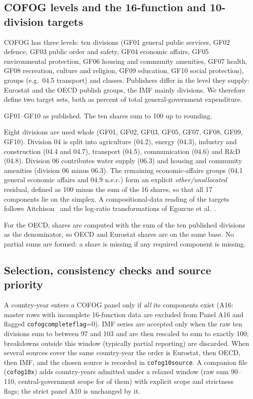 \documentclass[11pt,a4paper]{article}
\DeclareRobustCommand*{\_}{\textunderscore\hskip0pt\relax}
\begin{document}
\subsection{COFOG levels and the 16-function and 10-division targets}
COFOG has three levels: ten divisions (GF01 general public services, GF02 defence, GF03 public order and safety, GF04 economic affairs, GF05 environmental protection, GF06 housing and community amenities, GF07 health, GF08 recreation, culture and religion, GF09 education, GF10 social protection), groups (e.g.\ 04.5 transport) and classes. Publishers differ in the level they supply: Eurostat and the OECD publish groups, the IMF mainly divisions. We therefore define two target sets, both as percent of total general-government expenditure.
\begin{description}[leftmargin=1.2em,itemsep=2pt,parsep=0pt]
\item[A10 (ten divisions).] GF01--GF10 as published. The ten shares sum to 100 up to rounding.
\item[A16 (sixteen functions plus residual).] Eight divisions are used whole (GF01, GF02, GF03, GF05, GF07, GF08, GF09, GF10). Division 04 is split into agriculture (04.2), energy (04.3), industry and construction (04.4 and 04.7), transport (04.5), communication (04.6) and R\&D (04.8). Division 06 contributes water supply (06.3) and housing and community amenities (division 06 minus 06.3). The remaining economic-affairs groups (04.1 general economic affairs and 04.9 n.e.c.) form an explicit \emph{other/unallocated} residual, defined as 100 minus the sum of the 16 shares, so that all 17 components lie on the simplex. A compositional-data reading of the targets follows Aitchison~\cite{aitchison1986} and the log-ratio transformations of Egozcue et al.~\cite{egozcue2003}.
\end{description}
For the OECD, shares are computed with the sum of the ten published divisions as the denominator, so OECD and Eurostat shares are on the same base. No partial sums are formed: a share is missing if any required component is missing.

\subsection{Selection, consistency checks and source priority}
A country-year enters a COFOG panel only if \emph{all} its components exist (A16: \DSixIncomplete{} master rows with incomplete 16-function data are excluded from Panel A16 and flagged \texttt{cofog\_complete\_flag}=0). IMF series are accepted only when the raw ten divisions sum to between 97 and 103 and are then rescaled to sum to exactly 100; breakdowns outside this window (typically partial reporting) are discarded. When several sources cover the same country-year the order is Eurostat, then OECD, then IMF, and the chosen source is recorded in \texttt{cofog10\_source}. A companion file (\texttt{cofog10x}) adds \DTenXExtra{} country-years admitted under a relaxed window (raw sum 90--110, central-government scope for \DTenXCentral{} of them) with explicit scope and strictness flags; the strict panel A10 is unchanged by it.
\end{document}
